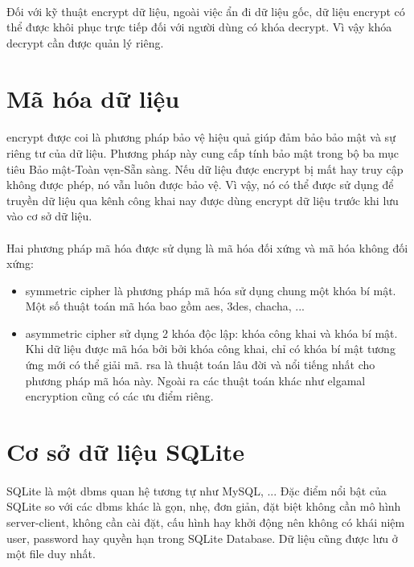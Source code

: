\paragraph{}
Đối với kỹ thuật \gls{encrypt} dữ liệu, ngoài việc ẩn đi dữ liệu gốc, dữ liệu \gls{encrypt} có thể được khôi phục trực tiếp đối với người dùng có khóa \gls{decrypt}. Vì vậy khóa \gls{decrypt} cần được quản lý riêng.

\section{Mã hóa dữ liệu}

\paragraph{}
\Gls{encrypt} được coi là phương pháp bảo vệ hiệu quả giúp đảm bảo bảo mật và sự riêng tư của dữ liệu. Phương pháp này cung cấp tính bảo mật trong bộ ba mục tiêu Bảo mật-Toàn vẹn-Sẵn sàng. Nếu dữ liệu được \gls{encrypt} bị mất hay truy cập không được phép, nó vẫn luôn được bảo vệ. Vì vậy, nó có thể được sử dụng để truyền dữ liệu qua kênh công khai nay được dùng \gls{encrypt} dữ liệu trước khi lưu vào cơ sở dữ liệu.

\paragraph{}
Hai phương pháp mã hóa được sử dụng là mã hóa đối xứng và mã hóa không đối xứng:
\begin{itemize}
	\item \Gls{symmetric cipher} là phương pháp mã hóa sử dụng chung một khóa bí mật. Một số thuật toán mã hóa bao gồm \gls{aes}, \gls{3des}, \gls{chacha}, ...
	\item \Gls{asymmetric cipher} sử dụng 2 khóa độc lập: khóa công khai và khóa bí mật. Khi dữ liệu được mã hóa bởi bởi khóa công khai, chỉ có khóa bí mật tương ứng mới có thể giải mã. \gls{rsa} là thuật toán lâu đời và nổi tiếng nhất cho phương pháp mã hóa này. Ngoài ra các thuật toán khác như \gls{elgamal encryption} cũng có các ưu điểm riêng.
\end{itemize}

\section{Cơ sở dữ liệu SQLite}

\paragraph{}
SQLite là một \gls{dbms} quan hệ tương tự như MySQL, ... Đặc điểm nổi bật của SQLite so với các \gls{dbms} khác là gọn, nhẹ, đơn giản, đặt biệt không cần mô hình server-client, không cần cài đặt, cấu hình hay khởi động nên không có khái niệm user, password hay quyền hạn trong SQLite Database. Dữ liệu cũng được lưu ở một file duy nhất.

